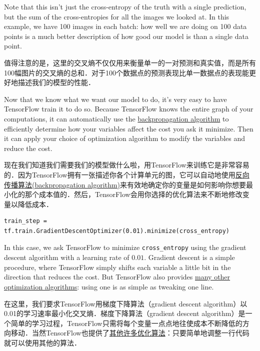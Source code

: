 Note that this isn't just the cross-entropy of the truth with a single prediction, but the sum of the cross-entropies for all the images we looked at. In this example, we have 100 images in each batch: how well we are doing on 100 data points is a much better description of how good our model is than a single data point.

值得注意的是，这里的交叉熵不仅仅用来衡量单一的一对预测和真实值，而是所有100幅图片的交叉熵的总和．对于100个数据点的预测表现比单一数据点的表现能更好地描述我们的模型的性能．

Now that we know what we want our model to do, it's very easy to have TensorFlow train it to do so. Because TensorFlow knows the entire graph of your computations, it can automatically use the \href{http://colah.github.io/posts/2015-08-Backprop/}{backpropagation algorithm} to efficiently determine how your variables affect the cost you ask it minimize. Then it can apply your choice of optimization algorithm to modify the variables and reduce the cost.

现在我们知道我们需要我们的模型做什么啦，用TensorFlow来训练它是非常容易的．因为TensorFlow拥有一张描述你各个计算单元的图，它可以自动地使用\href{http://colah.github.io/posts/2015-08-Backprop/}{反向传播算法(backpropagation algorithm)}来有效地确定你的变量是如何影响你想要最小化的那个成本值的．然后，TensorFlow会用你选择的优化算法来不断地修改变量以降低成本．

\begin{lstlisting}
train_step = tf.train.GradientDescentOptimizer(0.01).minimize(cross_entropy)
\end{lstlisting}

In this case, we ask TensorFlow to minimize \lstinline{cross_entropy} using the gradient descent algorithm with a learning rate of $0.01$. Gradient descent is a simple procedure, where TensorFlow simply shifts each variable a little bit in the direction that reduces the cost. But TensorFlow also provides \href{https://www.tensorflow.org/versions/master/api_docs/python/train.html#optimizers}{many other optimization algorithms}: using one is as simple as tweaking one line.

在这里，我们要求TensorFlow用梯度下降算法（gradient descent algorithm）以0.01的学习速率最小化交叉熵．梯度下降算法（gradient descent algorithm）是一个简单的学习过程，TensorFlow只需将每个变量一点点地往使成本不断降低的方向移动．当然TensorFlow也提供了\href{https://www.tensorflow.org/versions/master/api_docs/python/train.html#optimizers}{其他许多优化算法}：只要简单地调整一行代码就可以使用其他的算法．

